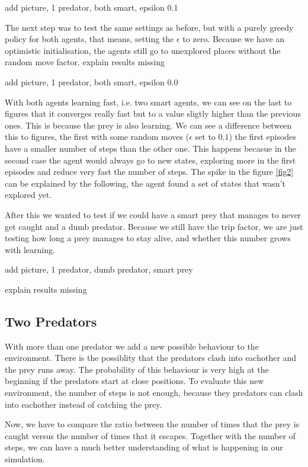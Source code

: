\documentclass{article}
\begin{document}
\error add picture, 1 predator, both smart, epsilon 0.1
\label{fig2}

The next step was to test the same settings as before, but with a purely greedy
policy for both agents, that means, setting the $\epsilon$ to zero. Because we
have an optimistic initialisation, the agents still go to unexplored places
without the random move factor.
\error explain results missing

\error add picture, 1 predator, both smart, epsilon 0.0

With both agents learning fast, i.e. two smart agents, we can see on the last to
figures that it converges really fast but to a value sligtly higher than the
previous ones. This is because the prey is also learning.
We can see a difference between this to figures, the first with some random
moves ($\epsilon$ set to $0.1$) the first episodes have a smaller number of
steps than the other one. This happens becasue in the second case the agent
would always go to new states, exploring more in the first episodes and reduce
very fast the number of steps.
The spike in the figure \ref{fig2} can be explained by the following, the agent
found a set of states that wasn't explored yet.

After this we wanted to test if we could have a smart prey that manages to never get caught and a dumb predator. Because we still have the trip
factor, we are just testing how long a prey manages to stay alive, and whether this
number grows with learning.

\error add picture, 1 predator, dumb predator, smart prey

\error explain results missing


\subsection{Two Predators}
\label{twoP}
With more than one predator we add a new possible behaviour to the environment. There is the possiblity that the predators clash into eachother and the prey runs away. The
probability of this behaviour is very high at the beginning if the
predators start at close positions. To evaluate this new environment, the number
of steps is not enough, because they predators can clash into eachother instead of catching the prey.

Now, we have to compare the ratio between the number of times that the prey
is caught versus the number of times that it escapes. Together 
with the number of steps, we can have a much better understanding of what is
happening in our simulation.
\end{document}

